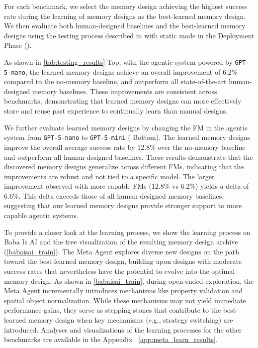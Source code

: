 \documentclass{article}
\theoremstyle{plain}
\theoremstyle{definition}
\theoremstyle{remark}
\begin{document}
For each benchmark, we select the memory design achieving the highest success rate during the learning of memory designs as the best-learned memory design. We then evaluate both human-designed baselines and the best-learned memory designs using the testing process described in  with static mode in the Deployment Phase ().

As shown in \cref{tab:testing_results} Top, with the agentic system powered by \texttt{GPT-5-nano}, the learned memory designs achieve an overall improvement of 6.2\% compared to the no-memory baseline, and outperform all state-of-the-art human-designed memory baselines.
These improvements are consistent across benchmarks, demonstrating that learned memory designs can more effectively store and reuse past experience to continually learn than manual designs.

We further evaluate learned memory designs by changing the FM in the agentic system from \texttt{GPT-5-nano} to \texttt{GPT-5-mini} ( Bottom).
The learned memory designs improve the overall average success rate by 12.8\% over the no-memory baseline and outperform all human-designed baselines. These results demonstrate that the discovered memory designs generalize across different FMs, indicating that the improvements are robust and not tied to a specific model. The larger improvement observed with more capable FMs (12.8\% vs 6.2\%) yields a delta of 6.6\%. This delta exceeds those of all human-designed memory baselines, suggesting that our learned memory designs provide stronger support to more capable agentic systems.

To provide a closer look at the learning process, we show the learning process on Baba Is AI and the tree visualization of the resulting memory design archive (\cref{babaisai_train}).
The Meta Agent explores diverse new designs on the path toward the best-learned memory design, building upon designs with moderate success rates that nevertheless have the potential to evolve into the optimal memory design. As shown in \cref{babaisai_train}, during open-ended exploration, the Meta Agent incrementally introduces mechanisms like property validation and spatial object normalization.
While these mechanisms may not yield immediate performance gains, they serve as stepping stones that contribute to the best-learned memory design when key mechanisms (e.g., strategy switching) are introduced. 
Analyses and visualizations of the learning processes for the other benchmarks are available in the Appendix ~\ref{app:meta_learn_results}.
\end{document}
